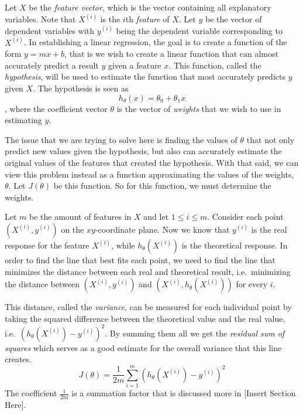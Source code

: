 \documentclass{book}[a5paper]
\newcommand{\placeholder}{[Insert Section Here]}
\begin{document}
Let $X$ be the \emph{feature vector}, which is the vector containing all
explanatory variables. Note that $X^{(i)}$ is the $i$th \emph{feature} of $X$.
Let $y$ be the vector of dependent variables with $y^{(i)}$ being the dependent
variable corresponding to $X^{(i)}$. In establishing a linear regression, the
goal is to create a function of the form $y=mx+b$, that is we wish to create a
linear function that can almost accurately predict a result $y$ given a feature
$x$. This function, called the \emph{hypothesis}, will be used to estimate the
function that most accurately predicts $y$ given $X$. The hypothesis is seen as 
\begin{equation}
    h_{\theta}(x) = \theta_0 + \theta_1x
\end{equation}
, where the coefficient vector $\theta$ is the vector of \emph{weights} that we
wish to use in estimating $y$.

The issue that we are trying to solve here is finding the values of ${\theta}$
that not only predict new values given the hypothesis, but also can accurately
estimate the original values of the features that created the hypothesis. With
that said, we can view this problem instead as a function approximating the
values of the weights, $\theta$. Let $J(\theta)$ be this function. So for this
function, we must determine the weights.

Let $m$ be the amount of features in $X$ and let $1 \leq i \leq m$. Consider
each point $(X^{(i)}, y^{(i)})$ on the $xy$-coordinate plane. Now we know that
$y^{(i)}$ is the real response for the feature $X^{(i)}$, while
$h_{\theta}(X^{(i)})$ is the theoretical response. In order to find the line
that best fits each point, we need to find the line that minimizes the distance
between each real and theoretical result, i.e.\ minimizing the distance between
$(X^{(i)}, y^{(i)})$ and $(X^{(i)}, h_{\theta}(X^{(i)}))$ for every $i$. 

This distance, called the \emph{variance}, can be measured for each individual
point by taking the squared difference between the theoretical value and the
real value, i.e.\  $(h_{\theta}(X^{(i)}) - y^{(i)})^2$. By summing them all we
get the \emph{residual sum of squares} which serves as a good estimate for the
overall variance that this line creates.
\begin{equation}
	J(\theta) = \frac{1}{2m}\sum_{i=1}^m(h_{\theta}(X^{(i)}) - y^{(i)})^2	
\end{equation}
The coefficient $\frac{1}{2m}$ is a summation factor that is discussed more in \placeholder.
 
\end{document}
